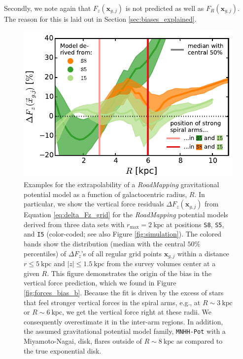 \documentclass[iop,revtex4,numberedappendix,appendixfloats]{emulateapj}
\newcommand{\vect}[1]{\boldsymbol{#1}}
\newcommand{\RM}{{\sl RoadMapping}}
\begin{document}
Secondly, we note again that $F_z(\vect{x}_{g,j})$ is not predicted as well as $F_R(\vect{x}_{g,j})$. The reason for this is laid out in Section \ref{sec:biases_explained}. 

\begin{figure}[!htbp]
\centering
    \includegraphics[width=\columnwidth]{fig/MNdHHdiffSph2_Fg_vs_R_2.pdf}
\caption{Examples for the extrapolability of a \RM{} gravitational potential model as a function of galactocentric radius, $R$. In particular, we show the vertical force residuals $\Delta F_z(\vect{x}_{g,j})$ from Equation \eqref{eq:delta_Fz_grid} for the \RM{} potential models derived from three data sets with $r_\text{max}=2~\text{kpc}$ at positions \texttt{S8}, \texttt{S5}, and \texttt{I5} (color-coded; see also Figure \ref{fig:simulation}). The colored bands show the distribution (median with the central $50\%$ percentiles) of $\Delta F_z$'s of all regular grid points $\vect{x}_{g,j}$ within a distance $r\leq5~\text{kpc}$ and $|z|\leq1.5~\text{kpc}$ from the survey volumes center at a given $R$. This figure demonstrates the origin of the bias in the vertical force prediction, which we found in Figure \ref{fig:forces_bias_b}. Because the fit is driven by the excess of stars that feel stronger vertical forces in the spiral arms, e.g., at $R\sim3~\text{kpc}$ or $R\sim6~\text{kpc}$, we get the vertical force right at these radii. We consequently overestimate it in the inter-arm regions. In addition, the assumed gravitational potential model family, \texttt{MNHH-Pot} with a Miyamoto-Nagai, disk, flares outside of $R\sim8~\text{kpc}$ as compared to the true exponential disk.}
\label{fig:Fg_vs_R}
\end{figure}
\end{document}
